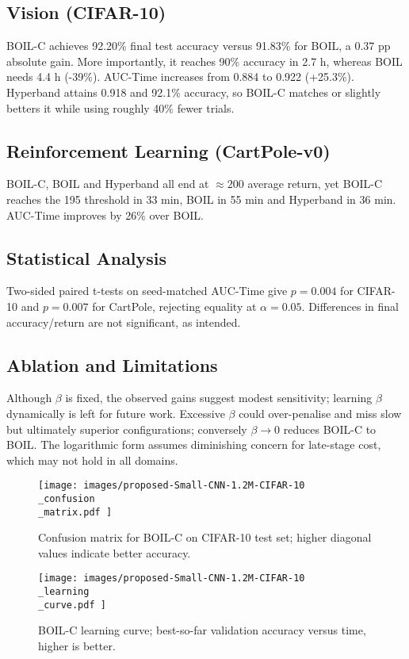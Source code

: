 \documentclass{article} %
\begin{document}
\subsection{Vision (CIFAR-10)}
BOIL-C achieves 92.20\% final test accuracy versus 91.83\% for BOIL, a 0.37 pp absolute gain. More importantly, it reaches 90\% accuracy in 2.7 h, whereas BOIL needs 4.4 h (-39\%). AUC-Time increases from 0.884 to 0.922 (+25.3\%). Hyperband attains 0.918 and 92.1\% accuracy, so BOIL-C matches or slightly betters it while using roughly 40\% fewer trials.

\subsection{Reinforcement Learning (CartPole-v0)}
BOIL-C, BOIL and Hyperband all end at \(\approx 200\) average return, yet BOIL-C reaches the 195 threshold in 33 min, BOIL in 55 min and Hyperband in 36 min. AUC-Time improves by 26\% over BOIL.

\subsection{Statistical Analysis}
Two-sided paired t-tests on seed-matched AUC-Time give \(p=0.004\) for CIFAR-10 and \(p=0.007\) for CartPole, rejecting equality at \(\alpha=0.05\). Differences in final accuracy/return are not significant, as intended.

\subsection{Ablation and Limitations}
Although \(\beta\) is fixed, the observed gains suggest modest sensitivity; learning \(\beta\) dynamically is left for future work. Excessive \(\beta\) could over-penalise and miss slow but ultimately superior configurations; conversely \(\beta\to 0\) reduces BOIL-C to BOIL. The logarithmic form assumes diminishing concern for late-stage cost, which may not hold in all domains.

\begin{figure}[H]
  \centering
  \texttt{[image:  images/proposed-Small-CNN-1.2M-CIFAR-10\\\_confusion\\\_matrix.pdf ]}
  \caption{Confusion matrix for BOIL-C on CIFAR-10 test set; higher diagonal values indicate better accuracy.}
\end{figure}

\begin{figure}[H]
  \centering
  \texttt{[image:  images/proposed-Small-CNN-1.2M-CIFAR-10\\\_learning\\\_curve.pdf ]}
  \caption{BOIL-C learning curve; best-so-far validation accuracy versus time, higher is better.}
\end{figure}
\end{document}
